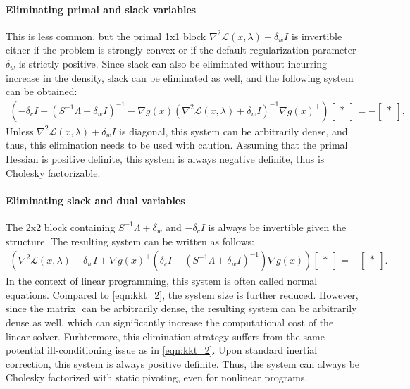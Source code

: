 \documentclass{article}
\begin{document}
\paragraph{Eliminating primal and slack variables}
This is less common, but the primal 1x1 block $\nabla^2 \mathcal{L}(x,\lambda) + \delta_w I$ is invertible either if the problem is strongly convex or if the default regularization parameter $\delta_w$ is strictly positive. Since slack can also be eliminated without incurring increase in the density, slack can be eliminated as well, and the following system can be obtained:
\begin{align}\label{eqn:kkt_dual}
  \left(- \delta_c I - (S^{-1}\Lambda + \delta_w I)^{-1} - \nabla g(x)\left(\nabla^2 \mathcal{L}(x,\lambda) + \delta_w I\right)^{-1} \nabla g(x)^\top\right)
  \begin{bmatrix}
    *\\
  \end{bmatrix} =
  -\begin{bmatrix}
    *\\
  \end{bmatrix},  
\end{align}
Unless $\nabla^2 \mathcal{L}(x,\lambda) + \delta_w I$ is diagonal, this system can be arbitrarily dense, and thus, this elimination needs to be used with caution. Assuming that the primal Hessian is positive definite, this system is always negative definite, thus is Cholesky factorizable.

\paragraph{Eliminating slack and dual variables}
The 2x2 block containing $S^{-1}\Lambda + \delta_w$ and $-\delta_c I$ is always be invertible given the structure. The resulting system can be written as follows:
\begin{align}\label{eqn:kkt_1}
  \left(\nabla^2 \mathcal{L}(x,\lambda) + \delta_w I + \nabla g(x)^\top \left(\delta_c I + (S^{-1}\Lambda + \delta_w I)^{-1}\right) \nabla g(x)\right)
  \begin{bmatrix}
    *\\
  \end{bmatrix} =
  -\begin{bmatrix}
    *\\
  \end{bmatrix}.
\end{align}
In the context of linear programming, this system is often called normal equations.
Compared to \eqref{eqn:kkt_2}, the system size is further reduced. However, since the matrix $ $ can be arbitrarily dense, the resulting system can be arbitrarily dense as well, which can significantly increase the computational cost of the linear solver. Furhtermore, this elimination strategy suffers from the same potential ill-conditioning issue as in \eqref{eqn:kkt_2}. Upon standard inertial correction, this system is always positive definite. Thus, the system can always be Cholesky factorized with static pivoting, even for nonlinear programs. 
\end{document}
